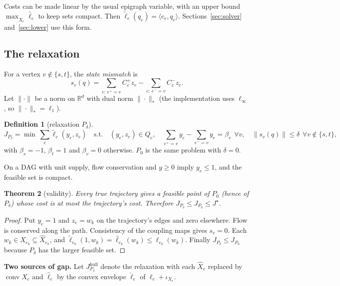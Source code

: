 \documentclass[11pt]{article}
\newcommand{\R}{\mathbb{R}}
\newcommand{\Pd}{P_\delta}
\newcommand{\Jd}{J_{P_\delta}}
\newcommand{\conv}{\operatorname{conv}}
\theoremstyle{plain}
\newtheorem{theorem}{Theorem}[section]
\theoremstyle{definition}
\newtheorem{definition}[theorem]{Definition}
\theoremstyle{remark}
\begin{document}
Costs can be made linear by the usual epigraph variable, with an upper bound $\max_{\hat X_e}\hat\ell_e$ to keep sets compact. Then $\tilde\ell_e(q_e)=\langle c_e,q_e\rangle$. Sections~\ref{sec:solver} and~\ref{sec:lower} use this form.

\subsection{The relaxation}
For a vertex $v\notin\{s,t\}$, the \emph{state mismatch} is
\[
s_v(q)=\sum_{e:\,e^+=v}C_e^+z_e-\sum_{e:\,e^-=v}C_e^-z_e .
\]
Let $\|\cdot\|$ be a norm on $\R^d$ with dual norm $\|\cdot\|_*$ (the implementation uses $\ell_\infty$, so $\|\cdot\|_*=\ell_1$).

\begin{definition}[relaxation $\Pd$]\label{def:Pd}
\[
\Jd=\min\ \sum_e\tilde\ell_e(y_e,z_e)\quad\text{s.t.}\quad (y_e,z_e)\in Q_e,\quad
\sum_{e^+=v}y_e-\sum_{e^-=v}y_e=\beta_v\ \ \forall v,\quad \|s_v(q)\|\le\delta\ \ \forall v\notin\{s,t\},
\]
with $\beta_s=-1$, $\beta_t=1$ and $\beta_v=0$ otherwise. $P_0$ is the same problem with $\delta=0$.
\end{definition}
On a DAG with unit supply, flow conservation and $y\ge0$ imply $y_e\le1$, and the feasible set is compact.

\begin{theorem}[validity]\label{thm:valid}
Every true trajectory gives a feasible point of $P_0$ (hence of $\Pd$) whose cost is at most the trajectory's cost. Therefore $\Jd\le J_{P_0}\le J^\star$.
\end{theorem}
\begin{proof}
Put $y_e=1$ and $z_e=w_k$ on the trajectory's edges and zero elsewhere. Flow is conserved along the path. Consistency of the coupling maps gives $s_v=0$. Each $w_k\in X_{e_k}\subseteq\hat X_{e_k}$, and $\tilde\ell_{e_k}(1,w_k)=\hat\ell_{e_k}(w_k)\le\ell_{e_k}(w_k)$. Finally $\Jd\le J_{P_0}$ because $\Pd$ has the larger feasible set.
\end{proof}

\textbf{Two sources of gap.} Let $J^{\mathrm{hull}}_{P_\delta}$ denote the relaxation with each $\hat X_e$ replaced by $\conv X_e$ and $\hat\ell_e$ by the convex envelope $\breve\ell_e$ of $\ell_e+\iota_{X_e}$.
\end{document}
